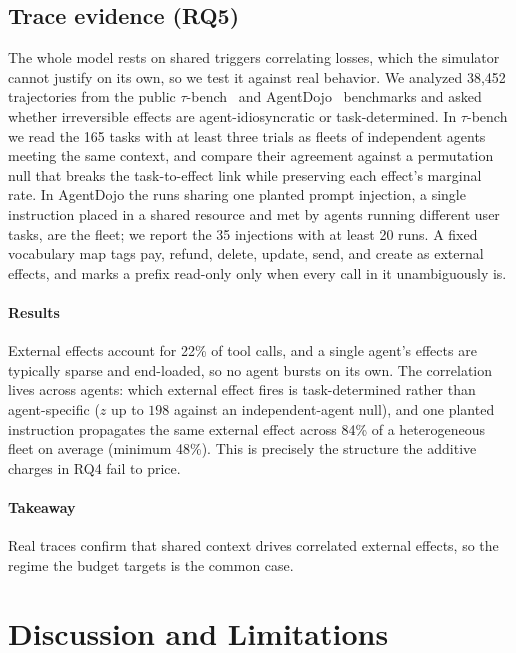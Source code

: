 \documentclass[sigconf]{acmart}
\begin{document}
\subsection{Trace evidence (RQ5)}
The whole model rests on shared triggers correlating losses, which the simulator cannot justify on its own, so we test it against real behavior. We analyzed 38{,}452 trajectories from the public $\tau$-bench~\cite{Yao2024TauBench} and AgentDojo~\cite{Debenedetti2024AgentDojo} benchmarks and asked whether irreversible effects are agent-idiosyncratic or task-determined. In $\tau$-bench we read the 165 tasks with at least three trials as fleets of independent agents meeting the same context, and compare their agreement against a permutation null that breaks the task-to-effect link while preserving each effect's marginal rate. In AgentDojo the runs sharing one planted prompt injection, a single instruction placed in a shared resource and met by agents running different user tasks, are the fleet; we report the 35 injections with at least 20 runs. A fixed vocabulary map tags pay, refund, delete, update, send, and create as external effects, and marks a prefix read-only only when every call in it unambiguously is.

\paragraph{Results} External effects account for 22\% of tool calls, and a single agent's effects are typically sparse and end-loaded, so no agent bursts on its own. The correlation lives across agents: which external effect fires is task-determined rather than agent-specific ($z$ up to $198$ against an independent-agent null), and one planted instruction propagates the same external effect across 84\% of a heterogeneous fleet on average (minimum 48\%). This is precisely the structure the additive charges in RQ4 fail to price.

\paragraph{Takeaway} Real traces confirm that shared context drives correlated external effects, so the regime the budget targets is the common case.

\section{Discussion and Limitations}
\label{sec:open}
\end{document}
